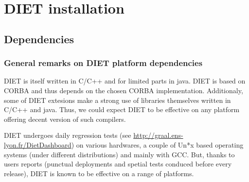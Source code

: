 
\chapter{DIET installation}
\label{ch:installing}

\section{Dependencies}
\label{sec:dependencies}

\subsection{General remarks on DIET platform dependencies}

DIET is itself written in C/C++ and for limited parts in java. DIET is
based on CORBA and thus depends on the chosen CORBA implementation.
Additionaly, some of DIET extesions make a strong use of libraries
themselves written in C/C++ and java.
Thus, we could expect DIET to be effective on any platform offering
decent version of such compilers.

DIET undergoes daily regression tests
(see \url{http://graal.ens-lyon.fr/DietDashboard})
on various hardwares, a couple of Un*x based operating systems (under
different distributions) and mainly with GCC.
But, thanks to users reports (punctual deployments and spetial tests
conduced before every release), DIET is known to be effective on a
range of platforms.

